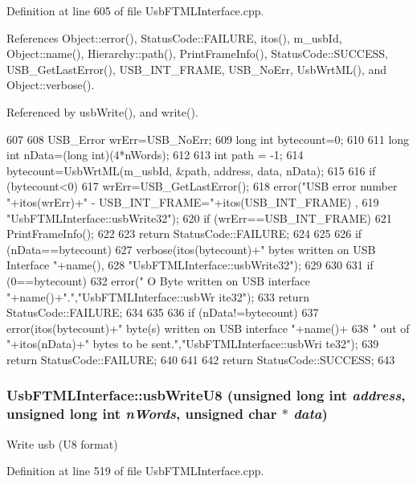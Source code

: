 Definition at line 605 of file UsbFTMLInterface.cpp.

References Object::error(), StatusCode::FAILURE, itos(), m\_\-usbId, Object::name(), Hierarchy::path(), PrintFrameInfo(), StatusCode::SUCCESS, USB\_\-GetLastError(), USB\_\-INT\_\-FRAME, USB\_\-NoErr, UsbWrtML(), and Object::verbose().

Referenced by usbWrite(), and write().


\begin{DoxyCode}
607                                                               {
608   USB_Error wrErr=USB_NoErr;
609   long int  bytecount=0;
610 
611   long int nData=(long int)(4*nWords);
612 
613   int path = -1;
614   bytecount=UsbWrtML(m_usbId, &path, address, data, nData);
615 
616   if (bytecount<0){
617     wrErr=USB_GetLastError();
618     error("USB error number "+itos(wrErr)+" - USB_INT_FRAME="+itos(USB_INT_FRAME)
      ,
619             "UsbFTMLInterface::usbWrite32");
620     if (wrErr==USB_INT_FRAME){
621       PrintFrameInfo();
622     } 
623     return StatusCode::FAILURE;
624   }
625 
626   if (nData==bytecount){
627     verbose(itos(bytecount)+" bytes written on USB Interface "+name(),
628             "UsbFTMLInterface::usbWrite32");
629   }
630   
631   if (0==bytecount){
632     error(" O Byte written on USB interface "+name()+".","UsbFTMLInterface::usbWr
      ite32");
633     return StatusCode::FAILURE;
634   }
635 
636   if (nData!=bytecount){
637     error(itos(bytecount)+" byte(s) written on USB interface "+name()+
638             " out of "+itos(nData)+" bytes to be sent.","UsbFTMLInterface::usbWri
      te32");
639     return StatusCode::FAILURE;    
640   }
641 
642   return StatusCode::SUCCESS;  
643 }
\end{DoxyCode}
\hypertarget{classUsbFTMLInterface_ae5cb7b250be9be23f90f455f57d41287}{
\subsubsection[{usbWriteU8}]{ UsbFTMLInterface::usbWriteU8 (unsigned long int {\em address}, \/  unsigned long int {\em nWords}, \/  unsigned char $\ast$ {\em data})}}
\label{classUsbFTMLInterface_ae5cb7b250be9be23f90f455f57d41287}
Write usb (U8 format) 

Definition at line 519 of file UsbFTMLInterface.cpp.

